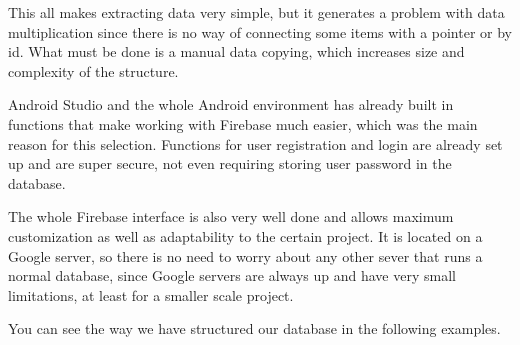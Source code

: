 This all makes extracting data very simple, but it generates a problem with data multiplication since there is no way of connecting some items with a pointer or by id. What must be done is a manual data copying, which increases size and complexity of the structure. \newline

Android Studio and the whole Android environment has already built in functions that make working with Firebase much easier, which was the main reason for this selection. Functions for user registration and login are already set up and are super secure, not even requiring storing user password in the database. \newline

The whole Firebase interface is also very well done and allows maximum customization as well as adaptability to the certain project. It is located on a Google server, so there is no need to worry about any other sever that runs a normal database, since Google servers are always up and have very small limitations, at least for a smaller scale project. \newline

You can see the way we have structured our database in the following examples. 


